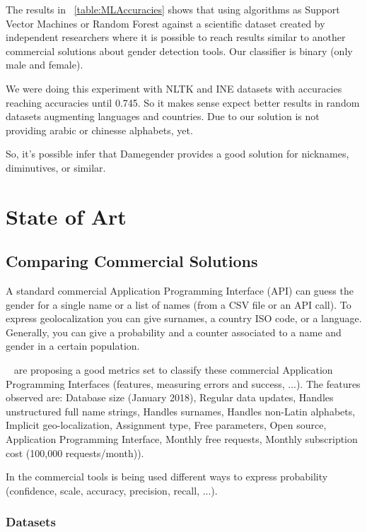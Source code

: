 \documentclass[a4paper]{article}
\begin{document}
The results in ~\ref{table:MLAccuracies} shows that using algorithms
as Support Vector Machines or Random Forest against a scientific
dataset created by independent researchers where it is possible to
reach results similar to another commercial solutions about gender
detection tools. Our classifier is binary (only male and female).

We were doing this experiment with NLTK and INE datasets with
accuracies reaching accuracies until 0.745. So it makes sense expect
better results in random datasets augmenting languages and
countries. Due to our solution is not providing arabic or chinesse
alphabets, yet.

So, it's possible infer that Damegender provides a good solution for
nicknames, diminutives, or similar.


\section{State of Art}

\subsection{Comparing Commercial Solutions}

A standard commercial Application Programming Interface (API) can
guess the gender for a single name or a list of names (from a CSV file
or an API call). To express geolocalization you can give surnames, a
country ISO code, or a language. Generally, you can give a probability
and a counter associated to a name and gender in a certain population.

~\cite{10.7717/peerj-cs.156} are proposing a good metrics set to
classify these commercial Application Programming Interfaces (features,
measuring errors and success, ...). The features observed are:
Database size (January 2018), Regular data updates, Handles
unstructured full name strings, Handles surnames, Handles non-Latin
alphabets, Implicit geo-localization, Assignment type, Free
parameters, Open source, Application Programming Interface, Monthly
free requests, Monthly subscription cost (100,000 requests/month)).

In the commercial tools is being used different ways to express
probability (confidence, scale, accuracy, precision, recall, ...). 

\subsubsection{Datasets}
\end{document}
